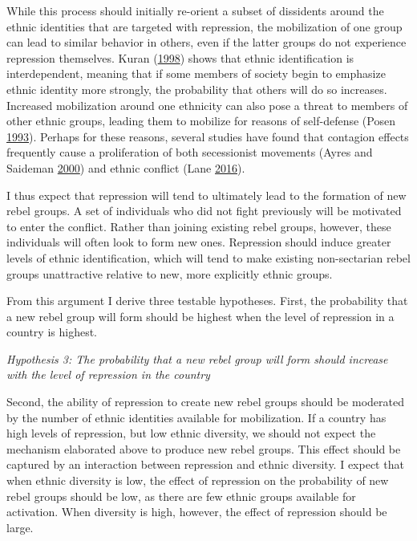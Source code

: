 \documentclass[12pt,]{book}
\theoremstyle{definition}
\theoremstyle{definition}
\theoremstyle{definition}
\theoremstyle{remark}
\begin{document}
While this process should initially re-orient a subset of dissidents
around the ethnic identities that are targeted with repression, the
mobilization of one group can lead to similar behavior in others, even
if the latter groups do not experience repression themselves. Kuran
(\protect\hyperlink{ref-Kuran1998}{1998}) shows that ethnic
identification is interdependent, meaning that if some members of
society begin to emphasize ethnic identity more strongly, the
probability that others will do so increases. Increased mobilization
around one ethnicity can also pose a threat to members of other ethnic
groups, leading them to mobilize for reasons of self-defense (Posen
\protect\hyperlink{ref-Posen1993}{1993}). Perhaps for these reasons,
several studies have found that contagion effects frequently cause a
proliferation of both secessionist movements (Ayres and Saideman
\protect\hyperlink{ref-Ayres2000}{2000}) and ethnic conflict (Lane
\protect\hyperlink{ref-Lane2016}{2016}).

I thus expect that repression will tend to ultimately lead to the
formation of new rebel groups. A set of individuals who did not fight
previously will be motivated to enter the conflict. Rather than joining
existing rebel groups, however, these individuals will often look to
form new ones. Repression should induce greater levels of ethnic
identification, which will tend to make existing non-sectarian rebel
groups unattractive relative to new, more explicitly ethnic groups.

From this argument I derive three testable hypotheses. First, the
probability that a new rebel group will form should be highest when the
level of repression in a country is highest.

\emph{Hypothesis 3: The probability that a new rebel group will form
should increase with the level of repression in the country}

Second, the ability of repression to create new rebel groups should be
moderated by the number of ethnic identities available for mobilization.
If a country has high levels of repression, but low ethnic diversity, we
should not expect the mechanism elaborated above to produce new rebel
groups. This effect should be captured by an interaction between
repression and ethnic diversity. I expect that when ethnic diversity is
low, the effect of repression on the probability of new rebel groups
should be low, as there are few ethnic groups available for activation.
When diversity is high, however, the effect of repression should be
large.
\end{document}
